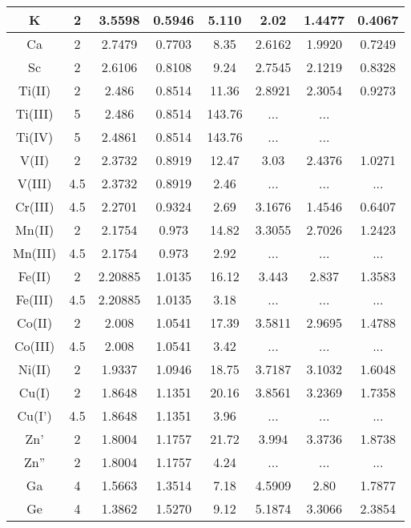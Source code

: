 \documentclass[journal]{IEEEtran}
\begin{document}
\begin{longtable}{|c|c|c|c|c|c|c|c|}
		K & 2 & 3.5598 & 0.5946 & 5.110 & 2.02 & 1.4477 & 0.4067 \\ 
		\hline 
		Ca & 2 & 2.7479 & 0.7703 & 8.35 & 2.6162 & 1.9920 & 0.7249 \\ 
		\hline 
		Sc & 2 & 2.6106 & 0.8108 & 9.24 & 2.7545 & 2.1219 & 0.8328 \\ 
		\hline 
		Ti(II) & 2 & 2.486 & 0.8514 & 11.36 & 2.8921 & 2.3054 & 0.9273 \\ 
		\hline 
		Ti(III) & 5 & 2.486 & 0.8514 & 143.76 & ... & ... & \\
		\hline
		Ti(IV) & 5 & 2.4861 & 0.8514 & 143.76 & ... & ... & \\
		\hline
		V(II) &2  & 2.3732 & 0.8919 & 12.47 & 3.03 & 2.4376 & 1.0271 \\ 
		\hline 
		V(III) & 4.5  & 2.3732 & 0.8919 & 2.46 & ... & ... & ... \\ 
		\hline
		Cr(III) &4.5& 2.2701 & 0.9324 & 2.69 & 3.1676& 1.4546 & 0.6407 \\ 
		\hline 
		Mn(II) & 2  & 2.1754 & 0.973 & 14.82&3.3055&2.7026&1.2423 \\ 
		\hline 
		Mn(III) & 4.5  & 2.1754 & 0.973 & 2.92&  ... & ... & ... \\ 
		\hline 
		Fe(II) & 2 & 2.20885 & 1.0135 & 16.12 & 3.443 & 2.837 & 1.3583 \\ 
		\hline 
		Fe(III) & 4.5 & 2.20885 & 1.0135 & 3.18 & ... & ...& ... \\ 
		\hline 
		Co(II) &2 & 2.008 & 1.0541 & 17.39 & 3.5811 & 2.9695 & 1.4788\\ 
		\hline 
		Co(III) &4.5 & 2.008 & 1.0541 & 3.42 & ... & ... & ...\\ 
		\hline 
		Ni(II) & 2 & 1.9337 & 1.0946 & 18.75 & 3.7187 & 3.1032 & 1.6048 \\ 
		\hline 
		Cu(I) & 2 &  1.8648 & 1.1351 & 20.16 & 3.8561 & 3.2369 & 1.7358 \\ 
		\hline 
		Cu(I') & 4.5  &  1.8648 & 1.1351 & 3.96 & ... & ... & ... \\ 
		\hline 
		Zn' & 2 & 1.8004 & 1.1757  & 21.72 & 3.994 & 3.3736 & 1.8738 \\ 
		\hline 
		Zn'' & 2 & 1.8004 & 1.1757  & 4.24 & ... & ... & ... \\ 
		\hline 
		Ga & 4 & 1.5663 &  1.3514 & 7.18& 4.5909 & 2.80 & 1.7877 \\ 
		\hline
		Ge & 4 & 1.3862  & 1.5270 & 9.12 & 5.1874 & 3.3066 & 2.3854 \\ 

\end{longtable}
\end{document}
